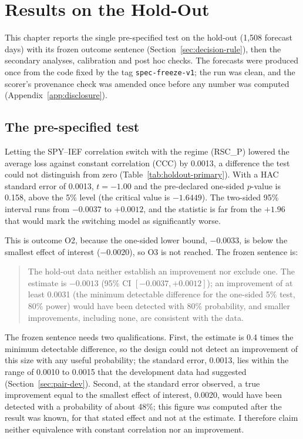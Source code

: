 \section{Results on the Hold-Out}\label{ch:holdout}

This chapter reports the single pre-specified test on the hold-out (1,508 forecast days) with its frozen outcome sentence (Section~\ref{sec:decision-rule}), then the secondary analyses, calibration and post hoc checks. The forecasts were produced once from the code fixed by the tag \texttt{spec-freeze-v1}; the run was clean, and the scorer's provenance check was amended once before any number was computed (Appendix~\ref{app:disclosure}).

\subsection{The pre-specified test}\label{sec:holdout-primary}

Letting the SPY--IEF correlation switch with the regime (RSC\_P) lowered the average loss against constant correlation (CCC) by 0.0013, a difference the test could not distinguish from zero (Table~\ref{tab:holdout-primary}). With a HAC standard error of 0.0013, $t=-1.00$ and the pre-declared one-sided $p$-value is 0.158, above the 5\% level (the critical value is $-1.6449$). The two-sided 95\% interval runs from $-0.0037$ to $+0.0012$, and the statistic is far from the $+1.96$ that would mark the switching model as significantly worse.



This is outcome O2, because the one-sided lower bound, $-0.0033$, is below the smallest effect of interest ($-0.0020$), so O3 is not reached. The frozen sentence is:

\begin{quote}
The hold-out data neither establish an improvement nor exclude one. The estimate is $-0.0013$ (95\% CI $[-0.0037,+0.0012]$); an improvement of at least 0.0031 (the minimum detectable difference for the one-sided 5\% test, 80\% power) would have been detected with 80\% probability, and smaller improvements, including none, are consistent with the data.
\end{quote}

The frozen sentence needs two qualifications. First, the estimate is 0.4 times the minimum detectable difference, so the design could not detect an improvement of this size with any useful probability; the standard error, 0.0013, lies within the range of 0.0010 to 0.0015 that the development data had suggested (Section~\ref{sec:pair-dev}). Second, at the standard error observed, a true improvement equal to the smallest effect of interest, 0.0020, would have been detected with a probability of about 48\%; this figure was computed after the result was known, for that stated effect and not at the estimate. I therefore claim neither equivalence with constant correlation nor an improvement.

